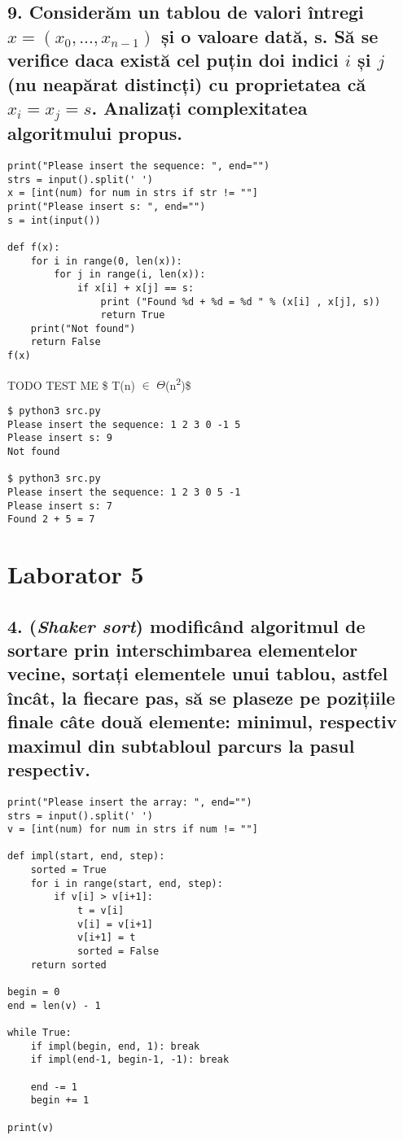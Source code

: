 \documentclass[11pt]{article}
\begin{document}
\subsection*{9. Considerăm un tablou de valori întregi \(x = (x_0, ..., x_{n-1})\) și o valoare dată, s. Să se verifice daca există cel puțin doi indici \(i\) și \(j\) (nu neapărat distincți) cu proprietatea că \(x_i = x_j = s\). Analizați complexitatea algoritmului propus.}
\label{sec:org2cd18d3}

\begin{verbatim}
print("Please insert the sequence: ", end="")
strs = input().split(' ')
x = [int(num) for num in strs if str != ""]
print("Please insert s: ", end="")
s = int(input())

def f(x):
    for i in range(0, len(x)):
        for j in range(i, len(x)):
            if x[i] + x[j] == s:
                print ("Found %d + %d = %d " % (x[i] , x[j], s))
                return True
    print("Not found")
    return False
f(x)
\end{verbatim}

TODO TEST ME
\$ T(n) \(\in\) \(\Theta\)(n\textsuperscript{2})\$

\begin{verbatim}
$ python3 src.py
Please insert the sequence: 1 2 3 0 -1 5
Please insert s: 9
Not found

$ python3 src.py
Please insert the sequence: 1 2 3 0 5 -1
Please insert s: 7
Found 2 + 5 = 7 
\end{verbatim}


\pagebreak

\section*{Laborator 5}
\label{sec:org389859a}
\subsection*{4. (\textit{Shaker sort}) modificând algoritmul de sortare prin interschimbarea elementelor vecine, sortați elementele unui tablou, astfel încât, la fiecare pas, să se plaseze pe pozițiile finale câte două elemente: minimul, respectiv maximul din subtabloul parcurs la pasul respectiv.}
\label{sec:org0e1c175}

\begin{verbatim}
print("Please insert the array: ", end="")
strs = input().split(' ')
v = [int(num) for num in strs if num != ""]

def impl(start, end, step):
    sorted = True
    for i in range(start, end, step):
        if v[i] > v[i+1]:
            t = v[i]
            v[i] = v[i+1]
            v[i+1] = t
            sorted = False
    return sorted

begin = 0
end = len(v) - 1

while True:
    if impl(begin, end, 1): break
    if impl(end-1, begin-1, -1): break

    end -= 1
    begin += 1

print(v)

\end{verbatim}
\end{document}
